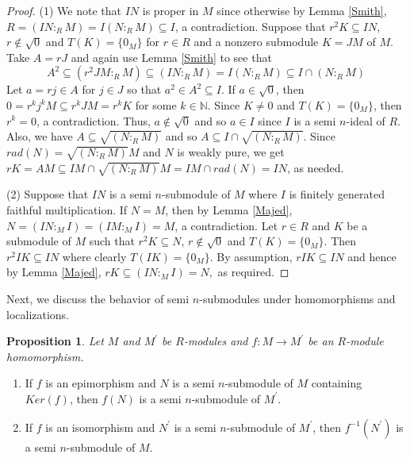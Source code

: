 \documentclass{amsart}%
\providecommand{\U}[1]{\protect\rule{.1in}{.1in}}
\theoremstyle{plain}
\newtheorem{proposition}{Proposition}
\numberwithin{equation}{section}
\begin{document}
\begin{proof}
(1) We note that $IN$ is proper in $M$ since otherwise by Lemma \ref{Smith},
$R=(IN:_{R}M)=I(N:_{R}M)\subseteq I$, a contradiction. Suppose that
$r^{2}K\subseteq IN$, $r\notin\sqrt{0}$ and $T(K)=\{0_{M}\}$ for $r\in R$ and
a nonzero submodule $K=JM$ of $M$. Take $A=rJ$ and again use Lemma \ref{Smith}
to see that
\[
A^{2}\subseteq(r^{2}JM:_{R}M)\subseteq(IN:_{R}M)=I(N:_{R}M)\subseteq
I\cap(N:_{R}M)
\]
Let $a=rj\in A$ for $j\in J$ so that $a^{2}\in A^{2}\subseteq I$. If
$a\in\sqrt{0}$, then $0=r^{k}j^{k}M\subseteq r^{k}JM=r^{k}K$ for some $k\in%
\mathbb{N}
$. Since $K\neq0$ and $T(K)=\{0_{M}\}$, then $r^{k}=0$, a contradiction. Thus,
$a\notin\sqrt{0}$ and so $a\in I$ since $I$ is a semi $n$-ideal of $R$. Also,
we have $A\subseteq\sqrt{(N:_{R}M)}$ and so $A\subseteq I\cap\sqrt{(N:_{R}M)}%
$. Since $rad(N)=\sqrt{(N:_{R}M)}M$ and $N$ is weakly pure, we get
$rK=AM\subseteq IM\cap\sqrt{(N:_{R}M)}M=IM\cap rad(N)=IN$, as needed.

(2) Suppose that $IN$ is a semi $n$-submodule of $M$ where $I$ is finitely
generated faithful multiplication. If $N=M$, then by Lemma \ref{Majed},
$N=(IN:_{M}I)=(IM:_{M}I)=M$, a contradiction. Let $r\in R$ and $K$ be a
submodule of $M$ such that $r^{2}K\subseteq N$, $r\notin\sqrt{0}$ and
$T(K)=\{0_{M}\}$. Then $r^{2}IK\subseteq IN$ where clearly $T(IK)=\{0_{M}\}$.
By assumption, $rIK\subseteq IN$ and hence by Lemma \ref{Majed},
$rK\subseteq(IN:_{M}I)=N,$ as required.
\end{proof}

Next, we discuss the behavior of semi $n$-submodules under homomorphisms and localizations.

\begin{proposition}
\label{fsub}Let $M$ and $M^{\prime}$ be $R$-modules and $f:M\rightarrow
M^{\prime}$ be an $R$-module homomorphism.
\end{proposition}

\begin{enumerate}
\item If $f$ is an epimorphism and $N$ is a semi $n$-submodule of $M$
containing $Ker(f)$, then $f(N)$ is a semi $n$-submodule of $M^{\prime}$.

\item If $f$ is an isomorphism and $N^{\prime}$ is a semi $n$-submodule of
$M^{\prime}$, then $f^{-1}(N^{\prime})$ is a semi $n$-submodule of $M$.
\end{enumerate}
\end{document}
